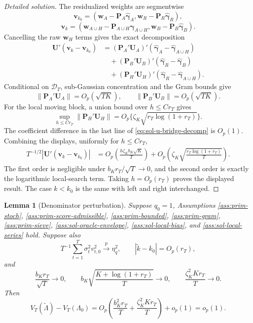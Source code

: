 \documentclass[12pt]{article}
\numberwithin{equation}{section}
\newtheorem{lemma}{Lemma}
\theoremstyle{definition}
\newcommand{\D}{\mathcal D}
\begin{document}
\begin{proof}[Detailed solution]
The residualized weights are segmentwise
\[
    \bm v_{k_0}=(\bm w_A-\bm P_A\widehat{\bm\gamma}_A,
             \bm w_R-\bm P_R\widehat{\bm\gamma}_R),
\]
\[
    \bm v_k=(\bm w_{A\cup H}-\bm P_{A\cup H}\widehat{\bm\gamma}_{A\cup H},
             \bm w_B-\bm P_B\widehat{\bm\gamma}_B).
\]
Cancelling the raw \(\bm w_H\) terms gives the exact decomposition
\begin{align}
    \bm U'(\bm v_k-\bm v_{k_0})
    &= (\bm P_A'\bm U_A)'
       (\widehat{\bm\gamma}_A-
        \widehat{\bm\gamma}_{A\cup H})
       \nonumber\\
    &\quad +(\bm P_B'\bm U_B)'
       (\widehat{\bm\gamma}_R-
        \widehat{\bm\gamma}_{B})
       \nonumber\\
    &\quad +(\bm P_H'\bm U_H)'
       (\widehat{\bm\gamma}_R-
        \widehat{\bm\gamma}_{A\cup H}).
    \label{eq:sol-u-bridge-decomp}
\end{align}
Conditional on \(\D_T\), sub-Gaussian concentration and the Gram bounds give
\[
    \|\bm P_A'\bm U_A\|=O_p(\sqrt{TK}),
    \qquad
    \|\bm P_B'\bm U_B\|=O_p(\sqrt{TK}).
\]
For the local moving block, a union bound over \(h\leq Cr_T\) gives
\[
    \sup_{h\leq Cr_T}\|\bm P_H'\bm U_H\|
      =O_p\{\zeta_K\sqrt{r_T\log(1+r_T)}\}.
\]
The coefficient difference in the last line of
\eqref{eq:sol-u-bridge-decomp} is \(O_p(1)\).  Combining the displays,
uniformly for \(h\leq Cr_T\),
\begin{align*}
    T^{-1/2}|\bm U'(\bm v_k-\bm v_{k_0})|
    &=O_p\left(\frac{h\zeta_Kb_K\sqrt K}{T}\right)
      +O_p\left(\zeta_K\sqrt{\frac{r_T\log(1+r_T)}{T}}\right).
\end{align*}
The first order is negligible under \(b_Kr_T/\sqrt T\to0\), and the second
order is exactly the logarithmic local-search term.  Taking \(h=O_p(r_T)\)
proves the displayed result.
The case \(k<k_0\) is the same with left and right interchanged.
\end{proof}


\begin{lemma}[Denominator perturbation]
\label{lem:wb-bridge-v}
Suppose \(q_0=1\), Assumptions \ref{ass:prim-stoch},
\ref{ass:prim-score-admissible}, \ref{ass:prim-bounded},
\ref{ass:prim-gram}, \ref{ass:prim-sieve}, \ref{ass:sol-oracle-envelope},
\ref{ass:sol-local-bias}, and \ref{ass:sol-local-series} hold.  Suppose also
\[
    T^{-1}\sum_{t=1}^T\sigma_t^2v_{t,0}^2\xrightarrow{p}\eta_q^2,
    \qquad |\widetilde k-k_0|=O_p(r_T),
\]
and
\[
    \frac{b_Kr_T}{\sqrt T}\to0,
    \qquad
    b_K\sqrt{\frac{K+\log(1+r_T)}{T}}\to0,
    \qquad
    \frac{\zeta_K^2K r_T}{T}\to0.
\]
Then
\[
    V_T(\widetilde\Lambda)-V_T(\Lambda_0)
    =O_p\left(
      \frac{b_K^2r_T}{T}
      +\frac{\zeta_K^2K r_T}{T}
    \right)+o_p(1)=o_p(1).
\]
\end{lemma}
\end{document}

